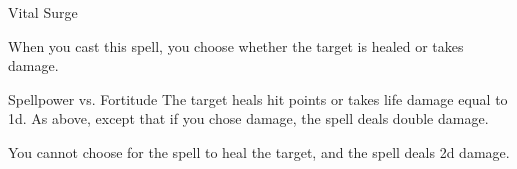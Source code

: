 \begin{spellsection}{Vital Surge}
\begin{spellcontent}
\begin{spelltargetinginfo}
\end{spelltargetinginfo}
\begin{spelleffects}
\spellspecial
When you cast this spell, you choose whether the target is healed or takes damage.
\begin{spellattack}{Spellpower vs. Fortitude}
\spellsuccess The target heals hit points or takes life damage equal to  \plus1d.
\spellcritical As above, except that if you chose damage, the spell deals double damage.
\end{spellattack}
\end{spelleffects}
\end{spellcontent}
\begin{spellfooter}
\end{spellfooter}
\begin{spellsubcontent}
\begin{spellcantrip}
You cannot choose for the spell to heal the target, and the spell deals \minus2d damage.
\end{spellcantrip}
\end{spellsubcontent}
\end{spellsection}
